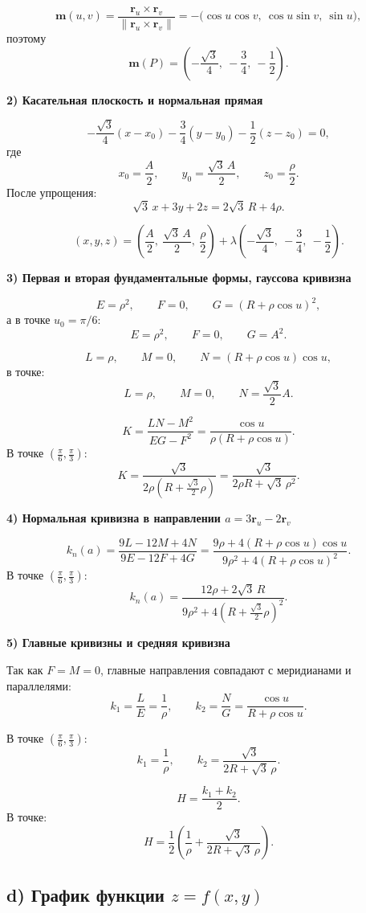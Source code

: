 \documentclass[12pt,a4paper]{article}
\begin{document}
\[
\mathbf m(u,v)=\frac{\mathbf r_u\times \mathbf r_v}{\|\mathbf r_u\times \mathbf r_v\|}
=-\bigl(\cos u\cos v,\ \cos u\sin v,\ \sin u\bigr),
\]
поэтому
\[
\mathbf m(P)=\left(-\frac{\sqrt3}{4},\ -\frac34,\ -\frac12\right).
\]

\textbf{2) Касательная плоскость и нормальная прямая}

\[
-\frac{\sqrt3}{4}(x-x_0)-\frac34(y-y_0)-\frac12(z-z_0)=0,
\]
где
\[
x_0=\frac A2,\qquad y_0=\frac{\sqrt3\,A}{2},\qquad z_0=\frac{\rho}{2}.
\]
После упрощения:
\[
\sqrt3\,x+3y+2z=2\sqrt3\,R+4\rho.
\]

\[
(x,y,z)=\left(\frac A2,\ \frac{\sqrt3\,A}{2},\ \frac{\rho}{2}\right)
+\lambda\left(-\frac{\sqrt3}{4},\ -\frac34,\ -\frac12\right).
\]

\textbf{3) Первая и вторая фундаментальные формы, гауссова кривизна}

\[
E=\rho^2,\qquad F=0,\qquad G=(R+\rho\cos u)^2,
\]
а в точке $u_0=\pi/6$:
\[
E=\rho^2,\qquad F=0,\qquad G=A^2.
\]

\[
L=\rho,\qquad M=0,\qquad N=(R+\rho\cos u)\cos u,
\]
в точке:
\[
L=\rho,\qquad M=0,\qquad N=\frac{\sqrt3}{2}A.
\]

\[
K=\frac{LN-M^2}{EG-F^2}
=\frac{\cos u}{\rho(R+\rho\cos u)}.
\]
В точке $\left(\frac{\pi}{6},\frac{\pi}{3}\right)$:
\[
K=\frac{\sqrt3}{2\rho\left(R+\frac{\sqrt3}{2}\rho\right)}
=\frac{\sqrt3}{2\rho R+\sqrt3\,\rho^2}.
\]

\textbf{4) Нормальная кривизна в направлении $a=3\mathbf r_u-2\mathbf r_v$}

\[
k_n(a)=\frac{9L-12M+4N}{9E-12F+4G}
=\frac{9\rho+4(R+\rho\cos u)\cos u}{9\rho^2+4(R+\rho\cos u)^2}.
\]
В точке $\left(\frac{\pi}{6},\frac{\pi}{3}\right)$:
\[
k_n(a)=\frac{12\rho+2\sqrt3\,R}{9\rho^2+4\left(R+\frac{\sqrt3}{2}\rho\right)^2}.
\]

\textbf{5) Главные кривизны и средняя кривизна}

Так как $F=M=0$, главные направления совпадают с меридианами и параллелями:
\[
k_1=\frac{L}{E}=\frac1{\rho},\qquad
k_2=\frac{N}{G}=\frac{\cos u}{R+\rho\cos u}.
\]

В точке $\left(\frac{\pi}{6},\frac{\pi}{3}\right)$:
\[
k_1=\frac1{\rho},\qquad
k_2=\frac{\sqrt3}{2R+\sqrt3\,\rho}.
\]

\[
H=\frac{k_1+k_2}{2}.
\]
В точке:
\[
H=\frac12\left(\frac1{\rho}+\frac{\sqrt3}{2R+\sqrt3\,\rho}\right).
\]

\subsection*{d) График функции $z=f(x,y)$}
\end{document}
